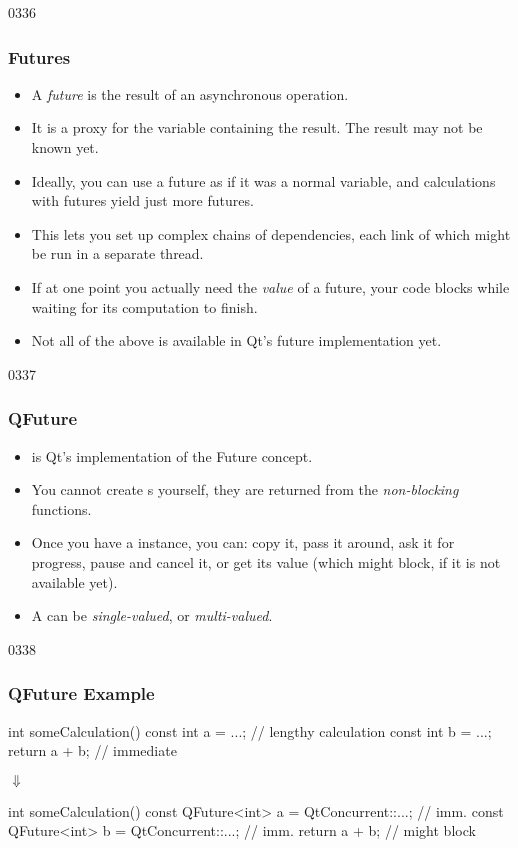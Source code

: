 \begin{slide}{0336}
\frametitle{Futures}
  \begin{itemize}
  \item A \emph{future} is the result of an asynchronous operation.
  \item It is a proxy for the variable containing the result. The
    result may not be known yet.
  \item Ideally, you can use a future as if it was a normal variable,
    and calculations with futures yield just more futures.
  \item This lets you set up complex chains of dependencies, each link
    of which might be run in a separate thread.
  \item If at one point you actually need the \emph{value} of a
    future, your code blocks while waiting for its computation to
    finish.
  \item Not all of the above is available in Qt's future
    implementation yet.
  \end{itemize}
\end{slide}
\begin{slide}{0337}
\frametitle{QFuture}\label{QFuture}
  \begin{itemize}
  \item {} is Qt's implementation of the Future concept.
  \item You cannot create s yourself, they are returned
    from the \emph{non-blocking}  functions.
  \item Once you have a  instance, you can: copy it,
    pass it around, ask it for progress, pause and cancel it, or get
    its value (which might block, if it is not available yet).
  \item A  can be \emph{single-valued}, or
    \emph{multi-valued}.
  \end{itemize}
\end{slide}
\begin{slide}[fragile]{0338}
\frametitle{QFuture Example}
\begin{center}
\begin{cpp}
int someCalculation() {
  const int a = ...; // lengthy calculation
  const int b = ...;
  return a + b; // immediate
}
\end{cpp}
{\Huge$\Downarrow$}
\begin{cpp}
int someCalculation() {
  const QFuture<int> a = QtConcurrent::...; // imm.
  const QFuture<int> b = QtConcurrent::...; // imm.
  return a + b; // might block
}
\end{cpp}
\end{center}
\end{slide}
